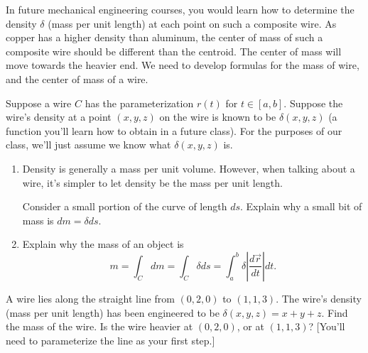  In future mechanical engineering courses, you would learn how to determine the density $\delta$ (mass per unit length) at each point on such a composite wire.  As copper has a higher density than aluminum, the center of mass of such a composite wire should be different than the centroid. The center of mass will move towards the heavier end. We need to develop formulas for the mass of wire, and the center of mass of a wire.

\begin{problem}[Mass]\label{mass of curve}%
%
 Suppose a wire $C$ has the parameterization $r(t)$ for $t\in[a,b]$.  Suppose the wire's density at a point $(x,y,z)$ on the wire is known to be $\delta(x,y,z)$ (a function you'll learn how to obtain in a future class). For the purposes of our class, we'll just assume we know what $\delta(x,y,z)$ is.   
 \begin{enumerate}
  \item Density is generally a mass per unit volume.  However, when talking about a wire, it's simpler to let density be the mass per unit length.  

  Consider a small portion of the curve of length $ds$.  Explain why a small bit of mass is $dm=\delta ds$.
  \item Explain why the mass of an object is $$m=\int_C dm = \int_C \delta ds = \int_a^b \delta \left|\frac{d\vec r}{dt}\right|dt.$$
 \end{enumerate}
\end{problem}


\begin{problem}%
 A wire lies along the straight line from $(0,2,0)$ to $(1,1,3)$.  The wire's density (mass per unit length) has been engineered to be $\delta(x,y,z)=x+y+z$.  Find the mass of the wire. Is the wire heavier at $(0,2,0)$, or at $(1,1,3)$? [You'll need to parameterize the line as your first step.]
\end{problem}

